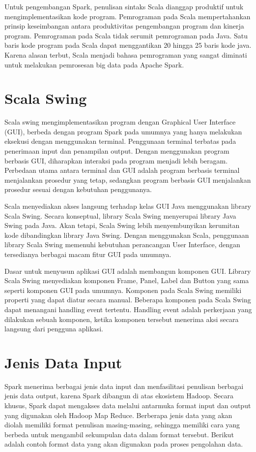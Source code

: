 \par Untuk pengembangan Spark, penulisan sintaks Scala dianggap produktif untuk mengimplementasikan kode program. Pemrograman pada Scala mempertahankan prinsip keseimbangan antara produktivitas pengembangan program dan kinerja program. Pemrograman pada Scala tidak serumit pemrograman pada Java. Satu baris kode program pada Scala dapat menggantikan 20 hingga 25 baris kode java. Karena alasan terbut, Scala menjadi bahasa pemrograman yang sangat diminati untuk melakukan pemrosesan big data pada Apache Spark.


\section{Scala Swing} 
Scala swing mengimplementasikan program dengan Graphical User Interface (GUI), berbeda dengan program Spark pada umumnya yang hanya melakukan eksekusi dengan menggunakan terminal. Penggunaan terminal terbatas pada penerimaan input dan penampilan output. Dengan menggunakan program berbasis GUI, diharapkan interaksi pada program menjadi lebih beragam. Perbedaan utama antara terminal dan GUI adalah program berbasis terminal menjalankan prosedur yang tetap, sedangkan program berbasis GUI menjalankan prosedur sesuai dengan kebutuhan penggunanya.

\par Scala menyediakan akses langsung terhadap kelas GUI Java menggunakan library Scala Swing. Secara konseptual, library Scala Swing menyerupai library Java Swing pada Java. Akan tetapi, Scala Swing lebih menyembunyikan kerumitan kode dibandingkan library Java Swing. Dengan menggunakan Scala, penggunaan library Scala Swing memenuhi kebutuhan perancangan User Interface, dengan tersedianya berbagai macam fitur GUI pada umumnya.

\par Dasar untuk menyusun aplikasi GUI adalah membangun komponen GUI.  Library Scala Swing menyediakan komponen Frame, Panel, Label dan Button yang sama seperti komponen GUI pada umumnya. Komponen pada Scala Swing memiliki properti yang dapat diatur secara manual. Beberapa komponen pada Scala Swing dapat menangani handling event tertentu. Handling event adalah perkerjaan yang dilakukan sebuah komponen, ketika komponen tersebut menerima aksi secara langsung dari pengguna aplikasi.

\section{Jenis Data Input}
Spark menerima berbagai jenis data input dan menfasilitasi penulisan berbagai jenis data output, karena Spark dibangun di atas ekosistem Hadoop. Secara khusus, Spark dapat mengakses data melalui antarmuka format input dan output yang digunakan oleh Hadoop Map Reduce. Berberapa jenis data yang akan diolah memiliki format penulisan masing-masing, sehingga memiliki cara yang berbeda untuk mengambil sekumpulan data dalam format tersebut. Berikut adalah contoh format data yang akan digunakan pada proses pengolahan data.   

